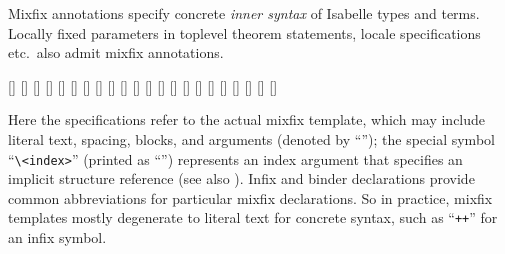 \begin{isabellebody}
\begin{isamarkuptext}
\begin{description}
  \end{description}%
\end{isamarkuptext}%
\isamarkuptrue%
%
\isamarkuptrue%
%
\begin{isamarkuptext}%
Mixfix annotations specify concrete \emph{inner syntax} of
  Isabelle types and terms.  Locally fixed parameters in toplevel
  theorem statements, locale specifications etc.\ also admit mixfix
  annotations.

  \begin{railoutput}
[]
\rail@bar
{}[]
\rail@bar
{}
[]
\rail@endbar
\rail@bar
{}
[]
\rail@endbar
{}
\rail@bar
{}[]
[]
[]
\rail@endbar
{}[]
[]
[]
[]
\rail@bar
{}
[]
\rail@endbar
{}[]
\rail@endbar
{}[]
\rail@end
{}
\rail@bar
{}[]
[]
[]
[]
\rail@endbar
\rail@end
{}
[]
\rail@plus
{}[]
[]
\rail@endplus
{}[]
\rail@end
\end{railoutput}


  Here the \hyperlink{syntax.string}{\mbox{}} specifications refer to the actual mixfix
  template, which may include literal text, spacing, blocks, and
  arguments (denoted by ``''); the special symbol
  ``\verb|\<index>|'' (printed as ``'') represents an index
  argument that specifies an implicit structure reference (see also
  ).  Infix and binder declarations provide common
  abbreviations for particular mixfix declarations.  So in practice,
  mixfix templates mostly degenerate to literal text for concrete
  syntax, such as ``\verb|++|'' for an infix symbol.


\end{isamarkuptext}
\end{isabellebody}
